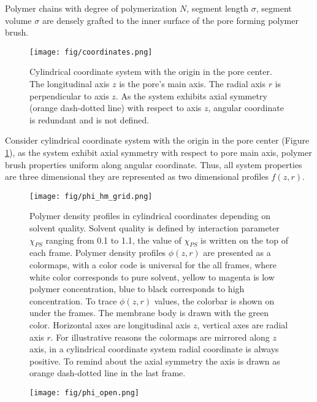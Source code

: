 \documentclass[12pt, a4paper]{article}
\begin{document}
Polymer chains with degree of polymerization $N$, segment length $\sigma$, segment volume $\sigma$ are densely grafted to the inner surface of the pore forming polymer brush.

\begin{figure}
    \centering
    \texttt{[image: fig/coordinates.png]}
    \caption{
    Cylindrical coordinate system with the origin in the pore center.
    The longitudinal axis $z$ is the pore's main axis.
    The radial axis $r$ is perpendicular to axis $z$.
    As the system exhibits axial symmetry (orange dash-dotted line) with respect to axis $z$, angular coordinate is redundant and is not defined.}
    \label{fig:coordinate_system}
\end{figure}

Consider cylindrical coordinate system with the origin in the pore center (Figure \ref{fig:coordinate_system}), as the system exhibit axial symmetry with respect to pore main axis, polymer brush properties uniform along angular coordinate.
Thus, all system properties are three dimensional they are represented as two dimensional profiles $f(z,r)$.

\begin{figure}
    \centering
    \texttt{[image: fig/phi\_hm\_grid.png]}
    \caption{
    Polymer density profiles in cylindrical coordinates depending on solvent quality. 
    Solvent quality is defined by interaction parameter $\chi_{PS}$ ranging from 0.1 to 1.1, the value of $\chi_{PS}$ is written on the top of each frame.
    Polymer density profiles $\phi(z,r)$ are presented as a colormaps, with a color code is universal for the all frames, where white color corresponds to pure solvent, yellow to magenta is low polymer concentration, blue to black corresponds to high concentration.
    To trace $\phi(z,r)$ values, the colorbar is shown on under the frames.
    The membrane body is drawn with the green color.
    Horizontal axes are longitudinal axis $z$, vertical axes are radial axis $r$.
    For illustrative reasons the colormaps are mirrored along $z$ axis, in a cylindrical coordinate system radial coordinate is always positive.
    To remind about the axial symmetry the axis is drawn as orange dash-dotted line in the last frame.
    }
    \label{fig:phi_hm_grid}
\end{figure}

\begin{figure}
    \centering
    \texttt{[image: fig/phi\_open.png]}
\end{figure}
\end{document}
